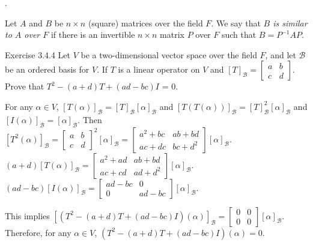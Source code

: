 \documentclass[8pt]{beamer}
\newcommand{\mc}[1]{\mathcal{#1}}
\newcommand{\ti}[1]{\textit{#1}}
\begin{document}
\begin{frame}{.}
    \begin{definition}
        Let $A$ and $B$ be $n\times n$ (square) matrices over the field $F$. We say that \ti{$B$ is similar to $A$ over $F$} if there is an invertible $n \times n$ matrix $P$ over $F$ such that $B = P^{-1}AP$.
    \end{definition}
    \begin{block}{Exercise 3.4.4}
        Let $V$ be a two-dimensional vector space over the field $F$, and let $\mc{B}$ be an ordered basis for $V$.
        If $T$ is a linear operator on $V$ and $[T]_{\mc{B}} = \left[\begin{matrix}
            a & b \\ c & d
        \end{matrix}\right]$.
        Prove that $T^2 - (a+d)T + (ad - bc)I$ = 0.
    \end{block}

    For any $\alpha \in V$, $[T(\alpha)]_{\mc{B}} = [T]_{\mc{B}} [\alpha]_{\mc{B}}$ and $[T(T(\alpha))]_{\mc{B}} = [T]_{\mc{B}}^2 [\alpha]_{\mc{B}}$ and $[I(\alpha)]_{\mc{B}} = [\alpha]_{\mc{B}}$.
    Then $[T^2(\alpha)]_{\mc{B}} = \left[\begin{matrix}
    a & b\\ c & d
    \end{matrix}\right]^2 [\alpha]_{\mc{B}} = \left[\begin{matrix}
        a^2 + bc & ab + bd \\ ac + dc & bc + d^2
    \end{matrix}\right] [\alpha]_{\mc{B}}$.
    $(a+d)[T(\alpha)]_{\mc{B}} = \left[\begin{matrix}
    a^2 + ad & ab + bd \\ ac + cd & ad + d^2
    \end{matrix}\right] [\alpha]_{\mc{B}}$.
    $(ad -bc)[I(\alpha)]_{\mc{B}} = \left[\begin{matrix}
        ad - bc & 0 \\ 0 & ad -bc
    \end{matrix}\right][\alpha]_{\mc{B}}$.

    This implies $[(T^2 - (a+d)T + (ad-bc)I)(\alpha)]_{\mc{B}} = \left[\begin{matrix}
    0 & 0 \\ 0 & 0
    \end{matrix}\right][\alpha]_{\mc{B}}$.
    Therefore, for any $\alpha \in V$, $(T^2 - (a+d)T + (ad - bc)I) (\alpha) = 0$.
\end{frame}
\end{document}
